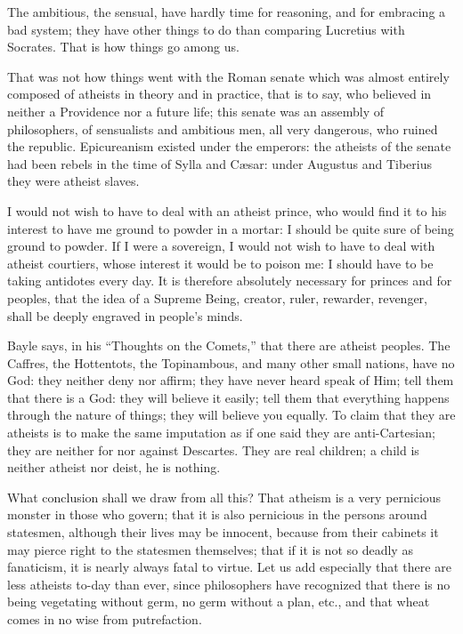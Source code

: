 The ambitious, the sensual, have hardly time for reasoning, and for
embracing a bad system; they have other things to do than comparing
Lucretius with Socrates. That is how things go among us.

That was not how things went with the Roman senate which was almost
entirely composed of atheists in theory and in practice, that is to say,
who believed in neither a Providence nor a future life; this senate was
an assembly of philosophers, of sensualists and ambitious men, all very
dangerous, who ruined the republic. Epicureanism existed under the
emperors: the atheists of the senate had been rebels in the time of
Sylla and Cæsar: under Augustus and Tiberius they were atheist slaves.

I would not wish to have to deal with an atheist prince, who would find
it to his interest to have me ground to powder in a mortar: I should be
quite sure of being ground to powder. If I were a sovereign, I would not
wish to have to deal with atheist courtiers, whose interest it would be
to poison me: I should have to be taking antidotes every day. It is
therefore absolutely necessary for princes and for peoples, that the
idea of a Supreme Being, creator, ruler, rewarder, revenger, shall be
deeply engraved in people's minds.

Bayle says, in his \enquote{Thoughts on the Comets,} that there are atheist
peoples. The Caffres, the Hottentots, the Topinambous, and many other
small nations, have no God: they neither deny nor affirm; they have
never heard speak of Him; tell them that there is a God: they will
believe it easily; tell them that everything happens through the nature
of things; they will believe you equally. To claim that they are
atheists is to make the same imputation as if one said they are
anti-Cartesian; they are neither for nor against Descartes. They are
real children; a child is neither atheist nor deist, he is nothing.

What conclusion shall we draw from all this? That atheism is a very
pernicious monster in those who govern; that it is also pernicious in
the persons around statesmen, although their lives may be innocent,
because from their cabinets it may pierce right to the statesmen
themselves; that if it is not so deadly as fanaticism, it is nearly
always fatal to virtue. Let us add especially that there are less
atheists to-day than ever, since philosophers have recognized that there
is no being vegetating without germ, no germ without a plan, etc., and
that wheat comes in no wise from putrefaction.

